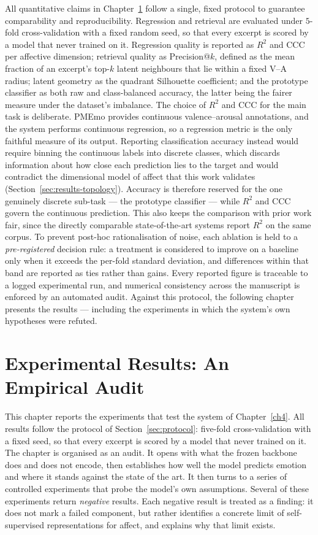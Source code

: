 \documentclass[12pt]{report}
\begin{document}
All quantitative claims in Chapter~\ref{chap:test} follow a single, fixed protocol to guarantee comparability and reproducibility. Regression and retrieval are evaluated under $5$-fold cross-validation with a fixed random seed, so that every excerpt is scored by a model that never trained on it. Regression quality is reported as $R^{2}$ and CCC per affective dimension; retrieval quality as Precision@$k$, defined as the mean fraction of an excerpt's top-$k$ latent neighbours that lie within a fixed V--A radius; latent geometry as the quadrant Silhouette coefficient; and the prototype classifier as both raw and class-balanced accuracy, the latter being the fairer measure under the dataset's imbalance. The choice of $R^{2}$ and CCC for the main task is deliberate. PMEmo provides continuous valence--arousal annotations, and the system performs continuous regression, so a regression metric is the only faithful measure of its output. Reporting classification accuracy instead would require binning the continuous labels into discrete classes, which discards information about how close each prediction lies to the target and would contradict the dimensional model of affect that this work validates (Section~\ref{sec:results-topology}). Accuracy is therefore reserved for the one genuinely discrete sub-task --- the prototype classifier --- while $R^{2}$ and CCC govern the continuous prediction. This also keeps the comparison with prior work fair, since the directly comparable state-of-the-art systems report $R^{2}$ on the same corpus. To prevent post-hoc rationalisation of noise, each ablation is held to a \emph{pre-registered} decision rule: a treatment is considered to improve on a baseline only when it exceeds the per-fold standard deviation, and differences within that band are reported as ties rather than gains. Every reported figure is traceable to a logged experimental run, and numerical consistency across the manuscript is enforced by an automated audit. Against this protocol, the following chapter presents the results --- including the experiments in which the system's own hypotheses were refuted.

%
%

\chapter{Experimental Results: An Empirical Audit}
\label{chap:test}

This chapter reports the experiments that test the system of Chapter~\ref{ch4}. All results follow the protocol of Section~\ref{sec:protocol}: five-fold cross-validation with a fixed seed, so that every excerpt is scored by a model that never trained on it. The chapter is organised as an audit. It opens with what the frozen backbone does and does not encode, then establishes how well the model predicts emotion and where it stands against the state of the art. It then turns to a series of controlled experiments that probe the model's own assumptions. Several of these experiments return \emph{negative} results. Each negative result is treated as a finding: it does not mark a failed component, but rather identifies a concrete limit of self-supervised representations for affect, and explains why that limit exists.
\end{document}
